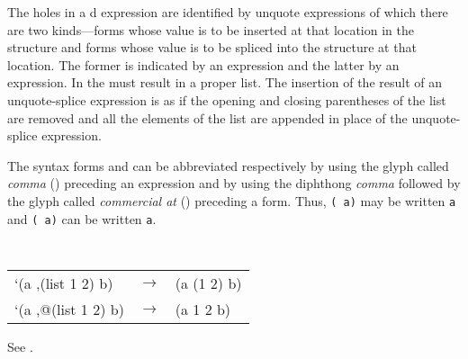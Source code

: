\begin{optDefinition}
\Syntax
{}%
%
\remarks%
The holes in a d expression are identified by unquote
expressions of which there are two kinds---forms whose value is to be inserted
at that location in the structure and forms whose value is to be spliced into
the structure at that location.  The former is indicated by an
 expression and the latter by an 
expression.  In  the  must result in a
proper list.  The insertion of the result of an unquote-splice expression is as
if the opening and closing parentheses of the list are removed and all the
elements of the list are appended in place of the unquote-splice expression.

The syntax forms  and  can be
abbreviated respectively by using the glyph called {\em comma} (\syntaxref{,})
 preceding an expression
and by using the diphthong {\em comma} followed by the glyph called {\em
    commercial at} ()  preceding a form.  Thus, {\tt ( a)} may be written
{\tt \syntaxref{,}a} and {\tt ( a)} can be written
{\tt {}a}.
%
\examples
{\tt
\begin{tabular}{lll}
    `(a ,(list 1 2) b) & $\rightarrow$ & (a (1 2) b)\\
    `(a ,@(list 1 2) b) & $\rightarrow$ & (a 1 2 b)
\end{tabular}}
%
\end{optDefinition}

%
\remarks%
See .


